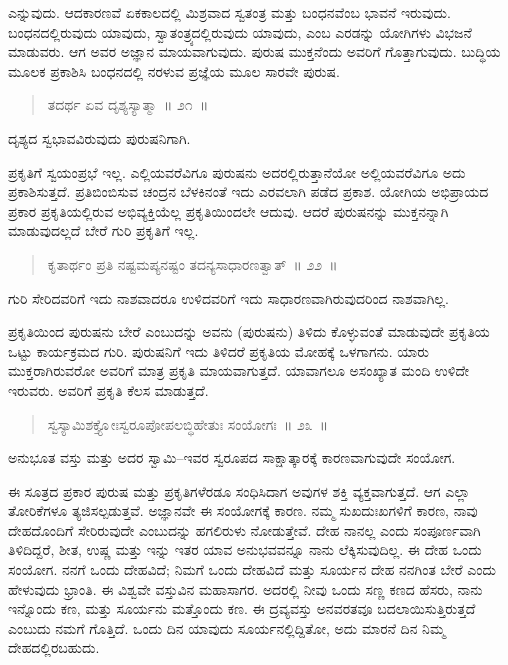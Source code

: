 ಎನ್ನುವುದು. ಆದಕಾರಣವೆ ಏಕಕಾಲದಲ್ಲಿ ಮಿಶ್ರವಾದ ಸ್ವತಂತ್ರ ಮತ್ತು ಬಂಧನವೆಂಬ ಭಾವನೆ ಇರುವುದು. ಬಂಧನದಲ್ಲಿರುವುದು ಯಾವುದು, ಸ್ವಾತಂತ್ರ್ಯದಲ್ಲಿರುವುದು ಯಾವುದು, ಎಂಬ ಎರಡನ್ನು ಯೋಗಿಗಳು ವಿಭಜನೆ ಮಾಡುವರು. ಆಗ ಅವರ ಅಜ್ಞಾನ ಮಾಯವಾಗುವುದು. ಪುರುಷ ಮುಕ್ತನೆಂದು ಅವರಿಗೆ ಗೊತ್ತಾಗುವುದು. ಬುದ್ಧಿಯ ಮೂಲಕ ಪ್ರಕಾಶಿಸಿ ಬಂಧನದಲ್ಲಿ ನರಳುವ ಪ್ರಜ್ಞೆಯ ಮೂಲ ಸಾರವೇ ಪುರುಷ. 

\vspace{-0.3cm}

\begin{verse}
ತದರ್ಥ ಏವ ದೃಶ್ಯಸ್ಯಾತ್ಮಾ~॥ ೨೧~॥
\end{verse}

\vspace{-0.3cm}

ದೃಶ್ಯದ ಸ್ವಭಾವವಿರುವುದು ಪುರುಷನಿಗಾಗಿ. 

ಪ್ರಕೃತಿಗೆ ಸ್ವಯಂಪ್ರಭೆ ಇಲ್ಲ. ಎಲ್ಲಿಯವರೆವಿಗೂ ಪುರುಷನು ಅದರಲ್ಲಿರುತ್ತಾನೆಯೋ ಅಲ್ಲಿಯವರೆವಿಗೂ ಅದು ಪ್ರಕಾಶಿಸುತ್ತದೆ. ಪ್ರತಿಬಿಂಬಿಸುವ ಚಂದ್ರನ ಬೆಳಕಿನಂತೆ ಇದು ಎರವಲಾಗಿ ಪಡೆದ ಪ್ರಕಾಶ. ಯೋಗಿಯ ಅಭಿಪ್ರಾಯದ ಪ್ರಕಾರ ಪ್ರಕೃತಿಯಲ್ಲಿರುವ ಅಭಿವ್ಯಕ್ತಿಯೆಲ್ಲ ಪ್ರಕೃತಿಯಿಂದಲೇ ಆದುವು. ಆದರೆ ಪುರುಷನನ್ನು ಮುಕ್ತನನ್ನಾಗಿ ಮಾಡುವುದಲ್ಲದೆ ಬೇರೆ ಗುರಿ ಪ್ರಕೃತಿಗೆ ಇಲ್ಲ. 

\vspace{-0.3cm}

\begin{verse}
ಕೃತಾರ್ಥಂ ಪ್ರತಿ ನಷ್ಟಮಪ್ಯನಷ್ಟಂ ತದನ್ಯಸಾಧಾರಣತ್ವಾತ್​~॥ ೨೨~॥
\end{verse}

\vspace{-0.3cm}

ಗುರಿ ಸೇರಿದವರಿಗೆ ಇದು ನಾಶವಾದರೂ ಉಳಿದವರಿಗೆ ಇದು ಸಾಧಾರಣವಾಗಿರು\break ವುದರಿಂದ ನಾಶವಾಗಿಲ್ಲ. 

ಪ್ರಕೃತಿಯಿಂದ ಪುರುಷನು ಬೇರೆ ಎಂಬುದನ್ನು ಅವನು (ಪುರುಷನು) ತಿಳಿದು ಕೊಳ್ಳುವಂತೆ ಮಾಡುವುದೇ ಪ್ರಕೃತಿಯ ಒಟ್ಟು ಕಾರ್ಯಕ್ರಮದ ಗುರಿ. ಪುರುಷನಿಗೆ ಇದು ತಿಳಿದರೆ ಪ್ರಕೃತಿಯ ಮೋಹಕ್ಕೆ ಒಳಗಾಗನು. ಯಾರು ಮುಕ್ತರಾಗಿರುವರೋ ಅವರಿಗೆ ಮಾತ್ರ ಪ್ರಕೃತಿ ಮಾಯವಾಗುತ್ತದೆ. ಯಾವಾಗಲೂ ಅಸಂಖ್ಯಾತ ಮಂದಿ ಉಳಿದೇ ಇರುವರು. ಅವರಿಗೆ ಪ್ರಕೃತಿ ಕೆಲಸ ಮಾಡುತ್ತದೆ. 

\vspace{-0.3cm}

\begin{verse}
ಸ್ವಸ್ಯಾಮಿಶಕ್ತ್ಯೋಃಸ್ವರೂಪೋಪಲಬ್ಧಿಹೇತುಃ ಸಂಯೋಗಃ~॥ ೨೩~॥
\end{verse}

\vspace{-0.3cm}

ಅನುಭೂತ ವಸ್ತು ಮತ್ತು ಅದರ ಸ್ವಾಮಿ–ಇವರ ಸ್ವರೂಪದ ಸಾಕ್ಷಾತ್ಕಾರಕ್ಕೆ ಕಾರಣವಾಗು\break ವುದೇ ಸಂಯೋಗ. 

ಈ ಸೂತ್ರದ ಪ್ರಕಾರ ಪುರುಷ ಮತ್ತು ಪ್ರಕೃತಿಗಳೆರಡೂ ಸಂಧಿಸಿದಾಗ ಅವುಗಳ ಶಕ್ತಿ ವ್ಯಕ್ತವಾಗುತ್ತದೆ. ಆಗ ಎಲ್ಲಾ ತೋರಿಕೆಗಳೂ ತ್ಯಜಿಸಲ್ಪಡುತ್ತವೆ. ಅಜ್ಞಾನವೇ ಈ ಸಂಯೋಗಕ್ಕೆ ಕಾರಣ. ನಮ್ಮ ಸುಖದುಃಖಗಳಿಗೆ ಕಾರಣ, ನಾವು ದೇಹದೊಂದಿಗೆ ಸೇರಿರುವುದೇ ಎಂಬುದನ್ನು ಹಗಲಿರುಳು ನೋಡುತ್ತೇವೆ. ದೇಹ ನಾನಲ್ಲ ಎಂದು ಸಂಪೂರ್ಣವಾಗಿ ತಿಳಿದಿದ್ದರೆ, ಶೀತ, ಉಷ್ಣ ಮತ್ತು ಇನ್ನು ಇತರ ಯಾವ ಅನುಭವವನ್ನೂ ನಾನು ಲೆಕ್ಕಿಸುವುದಿಲ್ಲ. ಈ ದೇಹ ಒಂದು ಸಂಯೋಗ. ನನಗೆ ಒಂದು ದೇಹವಿದೆ; ನಿಮಗೆ ಒಂದು ದೇಹವಿದೆ ಮತ್ತು ಸೂರ್ಯನ ದೇಹ ನನಗಿಂತ ಬೇರೆ ಎಂದು ಹೇಳುವುದು ಭ್ರಾಂತಿ. ಈ ವಿಶ್ವವೇ ವಸ್ತುವಿನ ಮಹಾಸಾಗರ. ಅದರಲ್ಲಿ ನೀವು ಒಂದು ಸಣ್ಣ ಕಣದ ಹೆಸರು, ನಾನು ಇನ್ನೊಂದು ಕಣ, ಮತ್ತು ಸೂರ್ಯನು ಮತ್ತೊಂದು ಕಣ. ಈ ದ್ರವ್ಯವಸ್ತು ಅನವರತವೂ ಬದಲಾಯಿಸು\break ತ್ತಿರುತ್ತದೆ ಎಂಬುದು ನಮಗೆ ಗೊತ್ತಿದೆ. ಒಂದು ದಿನ ಯಾವುದು ಸೂರ್ಯನಲ್ಲಿದ್ದಿತೋ, ಅದು ಮಾರನೆ ದಿನ ನಿಮ್ಮ ದೇಹದಲ್ಲಿರಬಹುದು. 

